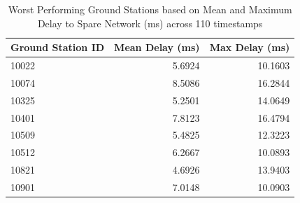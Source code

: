 \begin{table}[htbp]
\centering
\caption{Worst Performing Ground Stations based on Mean and Maximum Delay to Spare Network (ms) across 110 timestamps}
\label{tab:gs_delay_worst_performers}
\begin{tabular}{lrr}
\toprule
Ground Station ID & Mean Delay (ms) & Max Delay (ms) \\
\midrule
10022 & 5.6924 & 10.1603 \\
10074 & 8.5086 & 16.2844 \\
10325 & 5.2501 & 14.0649 \\
10401 & 7.8123 & 16.4794 \\
10509 & 5.4825 & 12.3223 \\
10512 & 6.2667 & 10.0893 \\
10821 & 4.6926 & 13.9403 \\
10901 & 7.0148 & 10.0903 \\
\bottomrule
\end{tabular}
\end{table}
